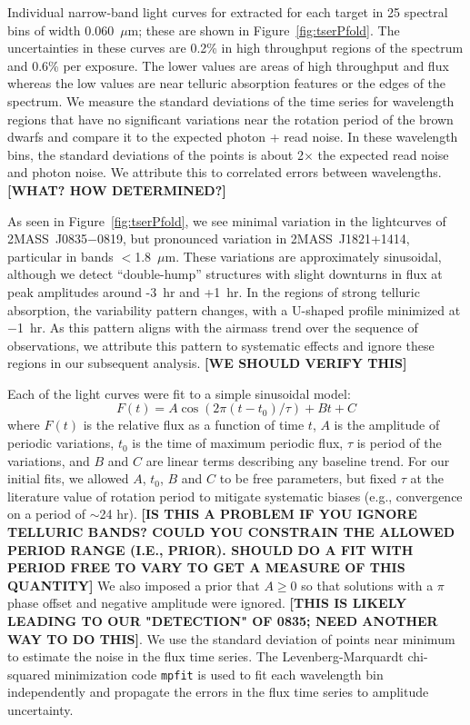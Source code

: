 \documentclass[twocolumn]{aastex6}
\newcommand{\sha}{2MASS~J0835$-$0819}
\newcommand{\shb}{2MASS~J1821+1414}
\begin{document}
Individual narrow-band light curves for extracted for each target in 25 spectral bins of width 0.060~$\mu$m; these are shown in Figure~\ref{fig:tserPfold}.
The uncertainties in these curves are 0.2\% in high throughput regions of the spectrum and 0.6\% per exposure.
The lower values are areas of high throughput and flux whereas the low values are near telluric absorption features or the edges of the spectrum.
We measure the standard deviations of the time series for wavelength regions that have no significant variations near the rotation period of the brown dwarfs and compare it to the expected photon + read noise.
In these wavelength bins, the standard deviations of the points is about 2$\times$ the expected read noise and photon noise.
We attribute this to correlated errors between wavelengths. {\bf [WHAT? HOW DETERMINED?]}

As seen in Figure~\ref{fig:tserPfold}, we see minimal variation in the lightcurves of {\sha}, but pronounced variation in {\shb}, particular in bands $<$1.8~$\mu$m.  These variations are approximately sinusoidal, although we detect ``double-hump'' structures with slight downturns in flux at peak amplitudes around -3~hr and +1~hr. In the regions of strong telluric absorption, the variability pattern changes, with a U-shaped profile minimized at $-$1~hr. As this pattern aligns with the airmass trend over the sequence of observations, we attribute this pattern to systematic effects and ignore these regions in our subsequent analysis.
{\bf [WE SHOULD VERIFY THIS]}

Each of the light curves were fit to a simple sinusoidal model:
\begin{equation}\label{eq:cosfit}
F(t) = A \cos(2 \pi (t - t_0)/\tau) + B t + C
\end{equation}
where $F(t)$ is the relative flux as a function of time $t$, $A$ is the amplitude of periodic variations, $t_0$ is the time of maximum periodic flux, $\tau$ is period of the variations, and $B$ and $C$ are linear terms describing any baseline trend.
For our initial fits, we allowed $A$, $t_0$, $B$ and $C$ to be free parameters, but fixed $\tau$ at the literature value of rotation period to mitigate systematic biases (e.g., convergence on a period of $\sim$24 hr). {\bf [IS THIS A PROBLEM IF YOU IGNORE TELLURIC BANDS? COULD YOU CONSTRAIN THE ALLOWED PERIOD RANGE (I.E., PRIOR). SHOULD DO A FIT WITH PERIOD FREE TO VARY TO GET A MEASURE OF THIS QUANTITY]}
We also imposed a prior that $A \geq 0$ so that solutions with a $\pi$ phase offset and negative amplitude were ignored.
{\bf [THIS IS LIKELY LEADING TO OUR "DETECTION" OF 0835; NEED ANOTHER WAY TO DO THIS]}.
We use the standard deviation of points near minimum to estimate the noise in the flux time series.
The Levenberg-Marquardt chi-squared minimization code \texttt{mpfit} is used to fit each wavelength bin independently and propagate the errors in the flux time series to amplitude uncertainty.
\end{document}
